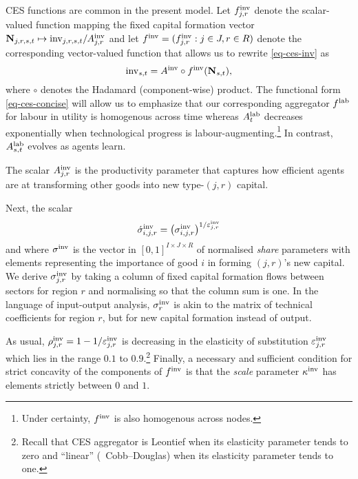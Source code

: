 \documentclass[12pt,a4paper,twoside, draft]{article}
\begin{document}
\begin{remark*}
  CES functions are common in the present
  model. 
  Let $f_{j, r}^{\textup{inv}}$ denote the scalar-valued
  function mapping the fixed capital formation vector
  $ \mathbf{N}_{j, r, {s}, t} \mapsto
  \textup{inv}_{j, r, {s}, t} / A_{j, r}^{\textup{inv}}$
  and let $f^{\textup{inv}} = (f_{j, r}^{\textup{inv}}: j \in J, r \in R )$
  denote the corresponding vector-valued function that allows us to rewrite
  \eqref{eq-ces-inv} as
  \begin{equation}\label{eq-ces-concise}
  \textup{inv}_{{s}, t} = A^{\textup{inv}}
    \circ f^{\textup{inv}}(\mathbf{N}_{{s}, t}),
  \end{equation}
  where $\circ$ denotes the Hadamard (component-wise) product.
  The functional form \cref{eq-ces-concise} will allow us to emphasize that our
  corresponding aggregator $f^{\textup{lab}}$ for labour in utility is
  homogenous across time whereas $A_{t}^{\textup{lab}}$ decreases exponentially
  when technological progress is labour-augmenting.\footnote{
    Under certainty, $f^{\textup{inv}}$ is also homogenous across nodes.
  }
  In contrast, $A_{{s}, t}^{\textup{lab}}$ evolves as agents learn.
\end{remark*}
The scalar $A_{j, r}^{\textup{inv}}$ is the productivity parameter that captures
how efficient agents are at transforming other goods into new type-$(j,r)$
capital.

Next, the scalar
\[
  \acute \sigma_{i,j, r}^{\textup{inv}}
  = \left( \sigma_{i,j, r}^{\textup{inv}} \right)
    ^ {1 / \varepsilon_{j, r}^{\textup{inv}}}
\]
and where $\sigma^{\textup{inv}}$ is the vector in
$[0, 1]^{I \times J \times R}$ of normalised \emph{share} parameters with
elements representing the importance of good $i$ in forming $(j, r)$'s new
capital.
We derive $\sigma_{j, r}^{\textup{inv}}$ by taking a column of fixed capital
formation flows between sectors for region $r$ and normalising so that the
column sum is one.
In the language of input-output analysis, $\sigma_{r}^{\textup{inv}}$ is akin
to the matrix of technical coefficients for region $r$, but for new capital
formation instead of output.

As usual,
$\rho_{j, r}^{\textup{inv}} = 1 - 1 / \varepsilon_{j, r}^{\textup{inv}}$ is
decreasing in the elasticity of substitution $\varepsilon_{j, r}^{\textup{inv}}$
which lies in the range $ 0.1 $ to $0.9$.\footnote{
  Recall that CES aggregator is Leontief when its elasticity
  parameter tends to zero and ``linear'' (\ie\ Cobb--Douglas) when its
  elasticity parameter tends to one.
}
Finally, a necessary and sufficient condition
\citep[Theorem 2]{Kojic-Concavity} for strict concavity of the
components of $f^{\textup{inv}}$ is that the \emph{scale} parameter
$\kappa^\textup{inv}$ has elements strictly between $0$ and $1$.
\end{document}
